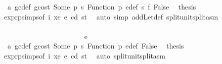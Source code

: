 \begin{isabellebody}
\ {}{}{\isacharparenleft}{\kern0pt}{}{\isacharparenright}{\kern0pt}\ a{}\ gc{\isacharunderscore}{\kern0pt}def\ gcost\ Some\ p{}\ s{}\ Function\ p{}\ e{\isacharprime}{\kern0pt}{\isacharunderscore}{\kern0pt}def\ s{}\ f{}\ False\ \isamarkupfalse%
\ {\isacharquery}{\kern0pt}thesis\ \isamarkupfalse%
\ expr{\isachardot}{\kern0pt}psimps{\isacharparenleft}{\kern0pt}{}{}{\isacharparenright}{\kern0pt}{\isacharbrackleft}{\kern0pt}of\ i\ xe\ e\ cd\ st{\isacharbrackright}{\kern0pt}\ \isamarkupfalse%
\ {\isacharparenleft}{\kern0pt}auto\ simp\ add{\isacharcolon}{\kern0pt}Let{\isacharunderscore}{\kern0pt}def\ split{\isacharcolon}{\kern0pt}unit{\isachardot}{\kern0pt}split{\isacharunderscore}{\kern0pt}asm{\isacharparenright}{\kern0pt}\isanewline
\ \ \ \ \ \ \ \ \ \ \ \ \ \ \ \ \ \ \ \ \ \ \ \ \isamarkupfalse%
\isanewline
\ \ \ \ \ \ \ \ \ \ \ \ \ \ \ \ \ \ \ \ \ \ \isamarkupfalse%
\isanewline
\ \ \ \ \ \ \ \ \ \ \ \ \ \ \ \ \ \ \ \ \isamarkupfalse%
\isanewline
\ \ \ \ \ \ \ \ \ \ \ \ \ \ \ \ \ \ \ \ \ \ \isamarkupfalse%
\ {\isacharparenleft}{\kern0pt}e\ {\isacharunderscore}{\kern0pt}{\isacharparenright}{\kern0pt}\isanewline
\ \ \ \ \ \ \ \ \ \ \ \ \ \ \ \ \ \ \ \ \ \ \isamarkupfalse%
\ {}{}{\isacharparenleft}{\kern0pt}{}{\isacharparenright}{\kern0pt}\ a{}\ gc{\isacharunderscore}{\kern0pt}def\ gcost\ Some\ p{}\ s{}\ Function\ p{}\ e{\isacharprime}{\kern0pt}{\isacharunderscore}{\kern0pt}def\ False\ \isamarkupfalse%
\ {\isacharquery}{\kern0pt}thesis\ \isamarkupfalse%
\ expr{\isachardot}{\kern0pt}psimps{\isacharparenleft}{\kern0pt}{}{}{\isacharparenright}{\kern0pt}{\isacharbrackleft}{\kern0pt}of\ i\ xe\ e\ cd\ st{\isacharbrackright}{\kern0pt}\ \isamarkupfalse%
\ {\isacharparenleft}{\kern0pt}auto\ split{\isacharcolon}{\kern0pt}unit{\isachardot}{\kern0pt}split{\isacharunderscore}{\kern0pt}asm{\isacharparenright}{\kern0pt}\isanewline
\ \ \ \ \ \ \ \ \ \ \ \ \ \ \ \ \ \ \ \ \isamarkupfalse%
\isanewline
\ \ \ \ \ \ \ \ \ \ \ \ \ \ \ \ \ \ \isamarkupfalse%
\isanewline
\ \ \ \ \ \ \ \ \ \ \ \ \ \ \ \ \isamarkupfalse%
\isanewline
\ \ \ \ \ \ \ \ \ \ \ \ \ \ \isamarkupfalse%
\isanewline
\ \ \ \ \ \ \ \ \ \ \ \ \ \ \ \ \isamarkupfalse%

\end{isabellebody}
